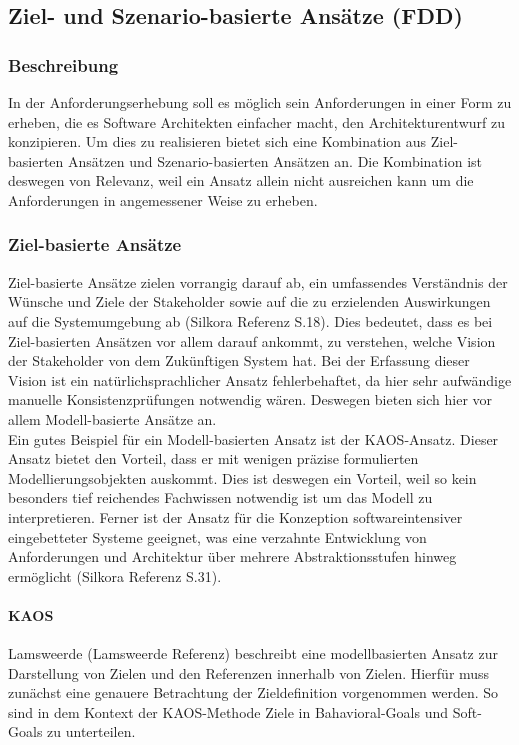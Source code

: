 \subsection{Ziel- und Szenario-basierte Ans\"atze (FDD)}
\subsubsection{Beschreibung}
In der Anforderungserhebung soll es m\"oglich sein Anforderungen in einer Form zu erheben, die es Software Architekten einfacher macht, den Architekturentwurf zu konzipieren. Um dies zu realisieren bietet sich eine Kombination aus Ziel-basierten Ans\"atzen und Szenario-basierten Ans\"atzen an. Die Kombination ist deswegen von Relevanz, weil ein Ansatz allein nicht ausreichen kann um die Anforderungen in angemessener Weise zu erheben.\\

\subsubsection{Ziel-basierte Ans\"atze}
Ziel-basierte Ans\"atze zielen vorrangig darauf ab, ein umfassendes Verst\"andnis der W\"unsche und Ziele der Stakeholder sowie auf die zu erzielenden Auswirkungen auf die Systemumgebung ab (Silkora Referenz S.18). Dies bedeutet, dass es bei Ziel-basierten Ans\"atzen vor allem darauf ankommt, zu verstehen, welche Vision der Stakeholder von dem Zuk\"unftigen System hat. Bei der Erfassung dieser Vision ist ein nat\"urlichsprachlicher Ansatz fehlerbehaftet, da hier sehr aufw\"andige manuelle Konsistenzpr\"ufungen notwendig w\"aren. Deswegen bieten sich hier vor allem Modell-basierte Ans\"atze an.\\

Ein gutes Beispiel f\"ur ein Modell-basierten Ansatz ist der KAOS-Ansatz. Dieser Ansatz bietet den Vorteil, dass er mit wenigen pr\"azise formulierten Modellierungsobjekten auskommt. Dies ist deswegen ein Vorteil, weil so kein besonders tief reichendes Fachwissen notwendig ist um das Modell zu interpretieren. Ferner ist der Ansatz f\"ur die Konzeption softwareintensiver eingebetteter Systeme geeignet, was eine verzahnte Entwicklung von Anforderungen und Architektur \"uber mehrere Abstraktionsstufen hinweg erm\"oglicht (Silkora Referenz S.31).\\

\paragraph{KAOS}
Lamsweerde (Lamsweerde Referenz) beschreibt eine modellbasierten Ansatz zur Darstellung von Zielen und den Referenzen innerhalb von Zielen. Hierf\"ur muss zun\"achst eine genauere Betrachtung der Zieldefinition vorgenommen werden. So sind in dem Kontext der KAOS-Methode Ziele in Bahavioral-Goals und Soft-Goals zu unterteilen. \\

